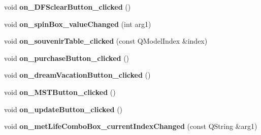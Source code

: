 \begin{DoxyCompactItemize}
void {\bfseries on\+\_\+\+D\+F\+Sclear\+Button\+\_\+clicked} ()
\item 
\mbox{\label{class_main_window_ab563c0d9e0225b55585cbfdba998c3cc}} 
void {\bfseries on\+\_\+spin\+Box\+\_\+value\+Changed} (int arg1)
\item 
\mbox{\label{class_main_window_a1ca615293b8c2dbeef99dbf61e82bb55}} 
void {\bfseries on\+\_\+souvenir\+Table\+\_\+clicked} (const Q\+Model\+Index \&index)
\item 
\mbox{\label{class_main_window_a1a7f2c3750064fcfc2af7b82e6e1f649}} 
void {\bfseries on\+\_\+purchase\+Button\+\_\+clicked} ()
\item 
\mbox{\label{class_main_window_aea2558859c02d5d8526863c8d3a1c272}} 
void {\bfseries on\+\_\+dream\+Vacation\+Button\+\_\+clicked} ()
\item 
\mbox{\label{class_main_window_a1d1b4ddc9165c7c0b8b4621cca3318a0}} 
void {\bfseries on\+\_\+\+M\+S\+T\+Button\+\_\+clicked} ()
\item 
\mbox{\label{class_main_window_a359777657f443a037a150890a3881817}} 
void {\bfseries on\+\_\+update\+Button\+\_\+clicked} ()
\item 
\mbox{\label{class_main_window_a51d08704f4e77805ae927cd5ae1903bd}} 
void {\bfseries on\+\_\+met\+Life\+Combo\+Box\+\_\+current\+Index\+Changed} (const Q\+String \&arg1)
\end{DoxyCompactItemize}
